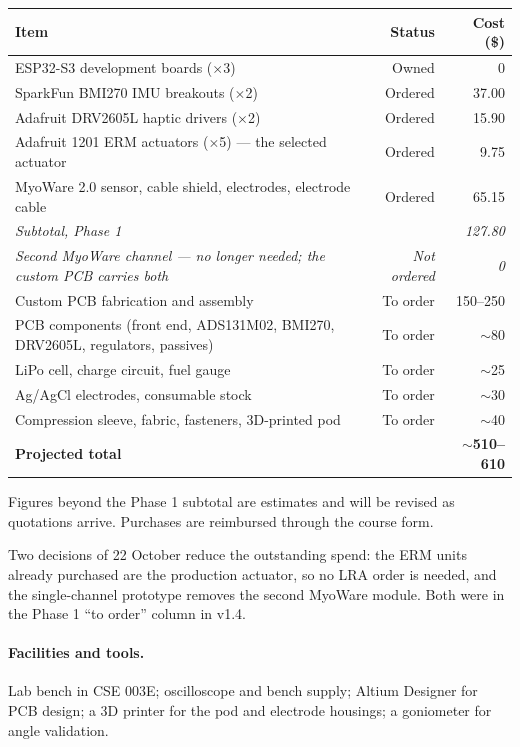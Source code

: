\documentclass[11pt]{article}
\begin{document}
\begin{table}[H]
\centering\small
\begin{tabularx}{\linewidth}{@{}X r r@{}}
\toprule
\textbf{Item} & \textbf{Status} & \textbf{Cost (\$)} \\
\midrule
ESP32-S3 development boards ($\times$3) & Owned & 0 \\
SparkFun BMI270 IMU breakouts ($\times$2) & Ordered & 37.00 \\
Adafruit DRV2605L haptic drivers ($\times$2) & Ordered & 15.90 \\
\rowcolor{good!8} Adafruit 1201 ERM actuators ($\times$5) --- the selected actuator & Ordered & 9.75 \\
MyoWare 2.0 sensor, cable shield, electrodes, electrode cable & Ordered & 65.15 \\
\midrule
\textit{Subtotal, Phase 1} & & \textit{127.80} \\
\midrule
\textit{Second MyoWare channel --- no longer needed; the custom PCB carries both} & \textit{Not ordered} & \textit{0} \\
Custom PCB fabrication and assembly & To order & 150--250 \\
PCB components (front end, ADS131M02, BMI270, DRV2605L, regulators, passives) & To order & $\sim$80 \\
LiPo cell, charge circuit, fuel gauge & To order & $\sim$25 \\
Ag/AgCl electrodes, consumable stock & To order & $\sim$30 \\
Compression sleeve, fabric, fasteners, 3D-printed pod & To order & $\sim$40 \\
\midrule
\textbf{Projected total} & & \textbf{$\sim$510--610} \\
\bottomrule
\end{tabularx}
\end{table}

\noindent
Figures beyond the Phase 1 subtotal are estimates and will be revised as
quotations arrive. Purchases are reimbursed through the course form.

\medskip
\noindent
Two decisions of 22 October reduce the outstanding spend: the ERM units already
purchased are the production actuator, so no LRA order is needed, and the
single-channel prototype removes the second MyoWare module. Both were in the
Phase 1 ``to order'' column in v1.4.

\paragraph{Facilities and tools.} Lab bench in CSE 003E; oscilloscope and bench
supply; Altium Designer for PCB design; a 3D printer for the pod and electrode
housings; a goniometer for angle validation.
\end{document}
